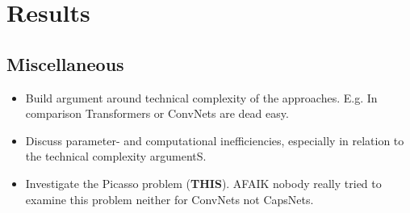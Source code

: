 \documentclass{article}
\begin{document}
\section{Results}
\subsection{Miscellaneous}
\begin{itemize}
	\item Build argument around technical complexity of the approaches. E.g. In comparison Transformers or ConvNets are dead easy.
	\item Discuss parameter- and computational inefficiencies, especially in relation to the technical complexity argumentS.
	\item Investigate the Picasso problem (\textbf{THIS}). AFAIK nobody really tried to examine this problem neither for ConvNets not CapsNets.
\end{itemize}
\end{document}

